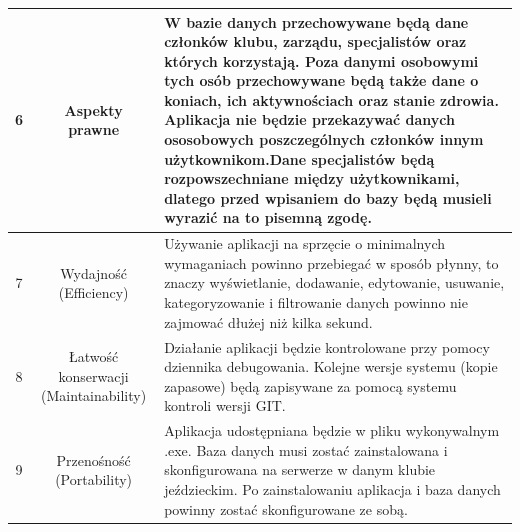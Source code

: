 \documentclass[12pt,oneside]{report}
\begin{document}
\begin{table}
\begin{tabular}{|c|c|p{8cm}|}
					\hline
		6& Aspekty prawne& W bazie danych przechowywane będą dane członków klubu, zarządu, specjalistów oraz których korzystają. Poza danymi osobowymi tych osób przechowywane będą także dane o koniach, ich aktywnościach oraz stanie zdrowia. Aplikacja nie będzie przekazywać danych ososobowych poszczególnych członków innym użytkownikom.Dane specjalistów będą rozpowszechniane między użytkownikami, dlatego przed wpisaniem do bazy będą musieli wyrazić na to pisemną zgodę.\\	
				\hline
		7& Wydajność (Efficiency)& Używanie aplikacji na sprzęcie o minimalnych wymaganiach powinno przebiegać w sposób płynny, to znaczy wyświetlanie, dodawanie, edytowanie, usuwanie, kategoryzowanie i filtrowanie danych powinno nie zajmować dłużej niż kilka sekund.\\	
		\hline
		8& Łatwość konserwacji (Maintainability)& Działanie aplikacji będzie kontrolowane przy pomocy dziennika debugowania. Kolejne wersje systemu (kopie zapasowe) będą zapisywane za pomocą systemu kontroli wersji GIT.\\	
		\hline
		9& Przenośność (Portability)& Aplikacja udostępniana będzie w pliku wykonywalnym .exe. Baza danych musi zostać zainstalowana i skonfigurowana na serwerze w danym klubie jeździeckim. Po zainstalowaniu aplikacja i baza danych powinny zostać skonfigurowane ze sobą.\\
		\hline
	\end{tabular}
\end{table}
\end{document}

